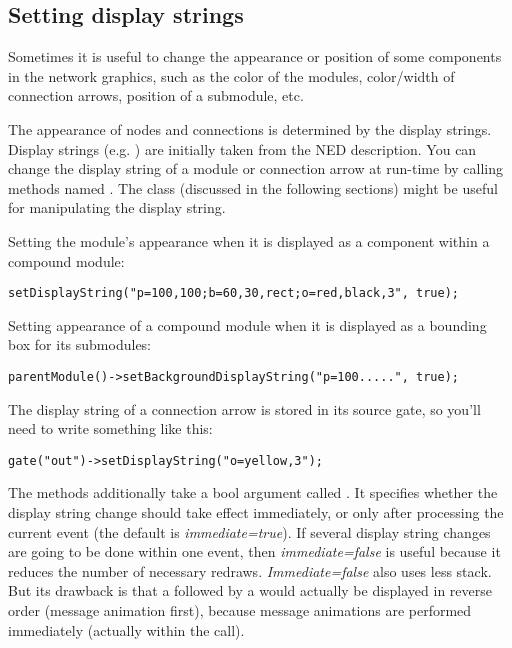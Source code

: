 \subsection{Setting display strings}

Sometimes it is useful to change the appearance or position of
some components in the network graphics, such as the color of the
modules, color/width of connection arrows,
position of a submodule, etc.

The appearance of nodes and connections is determined by the display
strings. Display strings (e.g. )
are initially taken from the NED description.
You can change the display string of a module or connection arrow
at run-time by calling methods named .
The  class (discussed in the following sections)
might be useful for manipulating the display string.

Setting the module's appearance when it is displayed as a component
within a compound module:

\begin{verbatim}
setDisplayString("p=100,100;b=60,30,rect;o=red,black,3", true);
\end{verbatim}

Setting appearance of a compound module when it is displayed as a
bounding box for its submodules:

\begin{verbatim}
parentModule()->setBackgroundDisplayString("p=100.....", true);
\end{verbatim}

The display string of a connection arrow
is stored in its source gate, so you'll need to write something
like this:

\begin{verbatim}
gate("out")->setDisplayString("o=yellow,3");
\end{verbatim}

The  methods additionally take a bool
argument called . It specifies whether the display
string change should take effect immediately, or only after processing
the current event (the default is \textit{immediate=true}). If several
display string changes are going to be done within one event, then
\textit{immediate=false} is useful because it reduces the number of
necessary redraws. \textit{Immediate=false} also uses less stack.  But
its drawback is that a  followed by a
 would actually be displayed in reverse order (message
animation first), because message animations are performed immediately
(actually within the  call).


